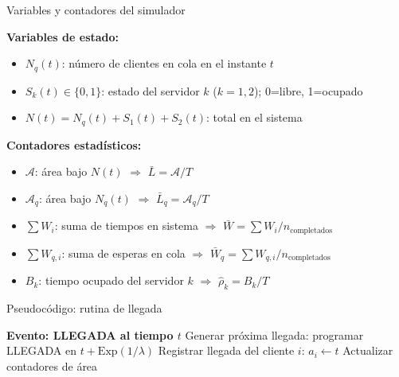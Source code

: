 \documentclass[aspectratio=1610, 9pt]{beamer}
\begin{document}
\begin{frame}{Variables y contadores del simulador}

\textbf{Variables de estado:}
\begin{itemize}
    \item $N_q(t)$: número de clientes en cola en el instante $t$
    \item $S_k(t) \in \{0,1\}$: estado del servidor $k$ ($k=1,2$); 0=libre, 1=ocupado
    \item $N(t) = N_q(t) + S_1(t) + S_2(t)$: total en el sistema
\end{itemize}

\vspace{0.3cm}
\textbf{Contadores estadísticos:}
\begin{itemize}
    \item $\mathcal{A}$: área bajo $N(t)$ $\Rightarrow$ $\bar{L} = \mathcal{A}/T$
    \item $\mathcal{A}_q$: área bajo $N_q(t)$ $\Rightarrow$ $\bar{L}_q = \mathcal{A}_q/T$
    \item $\sum W_i$: suma de tiempos en sistema $\Rightarrow$ $\bar{W} = \sum W_i / n_{\text{completados}}$
    \item $\sum W_{q,i}$: suma de esperas en cola $\Rightarrow$ $\bar{W}_q = \sum W_{q,i} / n_{\text{completados}}$
    \item $B_k$: tiempo ocupado del servidor $k$ $\Rightarrow$ $\hat{\rho}_k = B_k/T$
\end{itemize}
\end{frame}

\begin{frame}{Pseudocódigo: rutina de llegada}

\begin{algorithm}[H]
\SetAlgoLined
\small
\textbf{Evento: LLEGADA al tiempo $t$}\;
Generar próxima llegada: programar LLEGADA en $t + \text{Exp}(1/\lambda)$\;
Registrar llegada del cliente $i$: $a_i \leftarrow t$\;
Actualizar contadores de área\;
\end{algorithm}
\end{frame}
\end{document}

